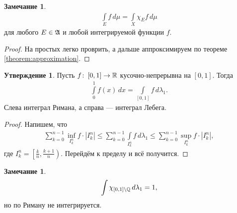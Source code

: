 \documentclass[a4paper,14pt]{extarticle}
\newcounter{theoremCnt}
\theoremstyle{definition}
\theoremstyle{plain}
\theoremstyle{plain}
\theoremstyle{plain}
\theoremstyle{plain}
\theoremstyle{definition}
\theoremstyle{definition}
\newtheorem{remrk}[theoremCnt]{Замечание}
\theoremstyle{definition}
\newtheorem{claim}[theoremCnt]{Утверждение}
\theoremstyle{definition}
\theoremstyle{definition}
\theoremstyle{definition}
\theoremstyle{plain}
\theoremstyle{plain}
\theoremstyle{plain}
\theoremstyle{plain}
\theoremstyle{definition}
\theoremstyle{definition}
\theoremstyle{definition}
\theoremstyle{definition}
\theoremstyle{definition}
\newcommand{\R}{\ensuremath \mathbb{R}}
\newcommand{\Q}{\ensuremath \mathbb{Q}}
\newcommand{\A}{\ensuremath \mathfrak{A}}
\begin{document}
\begin{remrk}
 \begin{align*}
  \int\limits_E f\,d\mu = \int\limits_X \chi_E f \,d\mu
 \end{align*} для любого $E \in \A$ и любой интегрируемой функции $f$.
\end{remrk}
\begin{proof}
 На простых легко проврить, а дальше аппроксимируем по теореме \ref{theorem:approximation}.
\end{proof}
\begin{claim}
 Пусть $f \colon\, [0,1] \to \R  $ кусочно-непрерывна на $[0,1]$. Тогда \begin{align*}
  \int\limits_{0}^{1} f(x) \, dx = \int\limits_{[0,1]} f \, d\lambda_1
 .\end{align*}  Слева интеграл Римана, а справа --- интеграл Лебега.
\end{claim}
\begin{proof}
 Напишем, что \begin{align*}
  \sum_{k=0}^{n - 1} \inf_{I_k^{n}} f \cdot \left| I_k^{n} \right| \leqslant \sum_{k=0}^{n - 1} \int\limits_{I_k^{n}} f \, d\lambda_1 \leqslant \sum_{k=0}^{n - 1} \sup_{I_k^{n}} f \cdot \left| I_k^{n} \right|
 ,\end{align*}  где $I_k^{n} = \left[ \frac{k}{n}, \frac{k+1}{n} \right)$. Перейдём к пределу и всё получится.
\end{proof}
\begin{remrk}
 \begin{align*}
  \int\limits \chi_{[0,1] \setminus \Q} \, d\lambda_1 = 1
 ,\end{align*} но по Риману не интегрируется.
\end{remrk}
\end{document}
